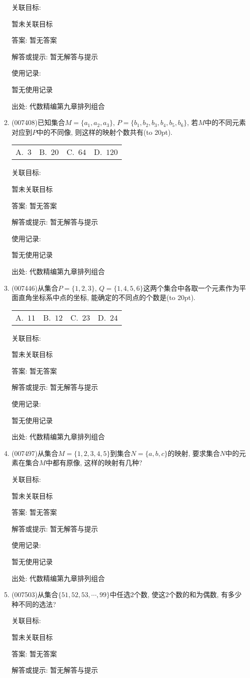 \documentclass[10pt,a4paper]{article}
\newcommand{\bracket}[1]{(\hbox to #1pt{})}
\newcommand{\fourch}[4]{\par\begin{tabular}{p{.23\textwidth}p{.23\textwidth}p{.23\textwidth}p{.23\textwidth}}
A.~#1 &B.~#2& C.~#3& D.~#4
\end{tabular}}
\begin{document}
\begin{enumerate}[1.]
关联目标:

暂未关联目标

答案: 暂无答案

解答或提示: 暂无解答与提示

使用记录:

暂无使用记录


出处: 代数精编第九章排列组合
\item { (007408)}已知集合$M=\{a_1,a_2,a_3\}$, $P=\{b_1,b_2,b_3,b_4,b_5,b_6\}$, 若$M$中的不同元素对应到$P$中的不同像, 则这样的映射个数共有\bracket{20}.
\fourch{$3$}{$20$}{$64$}{$120$}


关联目标:

暂未关联目标

答案: 暂无答案

解答或提示: 暂无解答与提示

使用记录:

暂无使用记录


出处: 代数精编第九章排列组合
\item { (007446)}从集合$P=\{1,2,3\}$, $Q=\{1,4,5,6\}$这两个集合中各取一个元素作为平面直角坐标系中点的坐标, 能确定的不同点的个数是\bracket{20}.
\fourch{$11$}{$12$}{$23$}{$24$}


关联目标:

暂未关联目标

答案: 暂无答案

解答或提示: 暂无解答与提示

使用记录:

暂无使用记录


出处: 代数精编第九章排列组合
\item { (007497)}从集合$M=\{1,2,3,4,5\}$到集合$N=\{a,b,c\}$的映射, 要求集合$N$中的元素在集合$M$中都有原像, 这样的映射有几种?


关联目标:

暂未关联目标

答案: 暂无答案

解答或提示: 暂无解答与提示

使用记录:

暂无使用记录


出处: 代数精编第九章排列组合
\item { (007503)}从集合$\{51,52,53,\cdots ,99\}$中任选$2$个数, 使这$2$个数的和为偶数, 有多少种不同的选法?


关联目标:

暂未关联目标

答案: 暂无答案

解答或提示: 暂无解答与提示


\end{enumerate}
\end{document}
